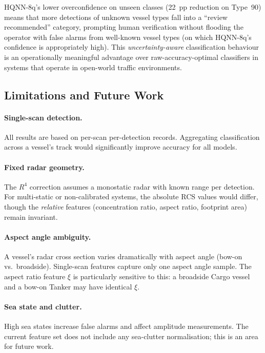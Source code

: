 \documentclass[journal]{IEEEtran}
\begin{document}
HQNN-8q's lower overconfidence on unseen classes (22~pp reduction on
Type~90) means that more detections of unknown vessel types fall into
a ``review recommended'' category, prompting human verification without
flooding the operator with false alarms from well-known vessel types
(on which HQNN-8q's confidence is appropriately high). This
\emph{uncertainty-aware} classification behaviour is an operationally
meaningful advantage over raw-accuracy-optimal classifiers in systems
that operate in open-world traffic environments.

\subsection{Limitations and Future Work}

\paragraph{Single-scan detection.} All results are based on per-scan
per-detection records. Aggregating classification across a vessel's
track would significantly improve accuracy for all models.

\paragraph{Fixed radar geometry.} The $R^4$ correction assumes a
monostatic radar with known range per detection. For multi-static or
non-calibrated systems, the absolute RCS values would differ, though
the \emph{relative} features (concentration ratio, aspect ratio,
footprint area) remain invariant.

\paragraph{Aspect angle ambiguity.} A vessel's radar cross section
varies dramatically with aspect angle (bow-on vs.\ broadside).
Single-scan features capture only one aspect angle sample. The
aspect ratio feature $\xi$ is particularly sensitive to this: a broadside
Cargo vessel and a bow-on Tanker may have identical $\xi$.

\paragraph{Sea state and clutter.} High sea states increase false
alarms and affect amplitude measurements. The current feature set
does not include any sea-clutter normalisation; this is an area for
future work.
\end{document}
